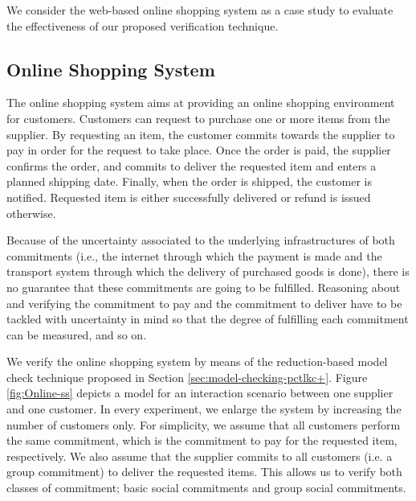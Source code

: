 We consider the web-based online shopping system \cite{Gomaa2011}
as a case study to evaluate the effectiveness of our proposed
verification technique.

\subsection{Online Shopping System}\label{sec:Online-s-s}

The online shopping system aims at
providing an online shopping environment for customers. Customers
can request to purchase one or more items from the supplier. By
requesting an item, the customer commits towards the supplier to
pay in order for the request to take place. Once the order is
paid, the supplier confirms the order, and commits to deliver the
requested item and enters a planned shipping date. Finally, when
the order is shipped, the customer is notified. Requested item is
either successfully delivered or refund is issued otherwise.

Because of the uncertainty associated to the underlying infrastructures of both commitments (i.e., the internet through which the payment is made and the transport system through which the delivery of purchased goods is done), there is no guarantee that these commitments are going to be fulfilled. Reasoning about and verifying the commitment to pay and the commitment to deliver have to be tackled with uncertainty in mind so that the degree of fulfilling each commitment can be measured, and so on.

We verify the online shopping system by means of
the reduction-based model check technique proposed in Section
\ref{sec:model-checking-pctlkc+}. Figure \ref{fig:Online-ss}
depicts a model for an interaction scenario between one supplier
and one customer. In every experiment, we enlarge the system by increasing the number of customers only. For simplicity, we assume that all customers perform the same commitment, which is the commitment to pay for the requested item, respectively. We also assume that the supplier commits to all customers (i.e. a group commitment) to deliver the requested
items. This allows us to verify both classes of commitment; basic
social commitments and group social commitments.

